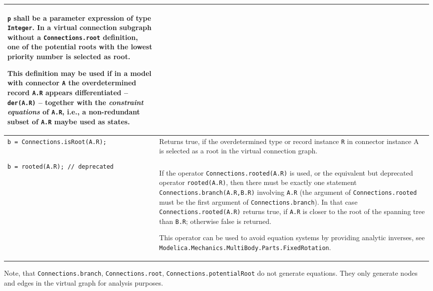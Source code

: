 \begin{longtable}[]{|p{5.1cm}|p{10cm}|}
\lstinline!p! shall be a parameter expression of type \lstinline!Integer!. In a
virtual connection subgraph without a \lstinline!Connections.root! definition, one
of the potential roots with the lowest priority number is selected as
root.
\par
\begin{nonnormative*}
This definition may be used if in a model with connector \lstinline!A! the overdetermined record \lstinline!A.R! appears differentiated -- \lstinline!der(A.R)! -- together
with the \emph{constraint equations} of \lstinline!A.R!, i.e., a non-redundant subset of \lstinline!A.R! maybe used as states.
\end{nonnormative*}
\\ \hline
\lstinline!b = Connections.isRoot(A.R);! & Returns true, if the overdetermined type
or record instance \lstinline!R! in connector instance A is selected as a root in
the virtual connection graph.\\ \hline
\begin{tabular}{@{}p{5.1cm}@{}}
\lstinline!b = Connections.rooted(A.R);!\\
\lstinline!b = rooted(A.R); // deprecated!
\end{tabular}
& If the operator \lstinline!Connections.rooted(A.R)!
is used, or the equivalent but deprecated operator \lstinline!rooted(A.R)!, then
there must be exactly one statement \lstinline!Connections.branch(A.R,B.R)!
involving \lstinline!A.R! (the argument of \lstinline!Connections.rooted! must be the first
argument of \lstinline!Connections.branch!). In that case \lstinline!Connections.rooted(A.R)!
returns true, if \lstinline!A.R! is closer to the root of the spanning tree than
\lstinline!B.R!; otherwise false is returned.
\par
\begin{nonnormative*}
This operator can be used to avoid equation systems by providing analytic inverses, see \lstinline!Modelica.Mechanics.MultiBody.Parts.FixedRotation!.
\end{nonnormative*}
\\ \hline
\end{longtable}

\begin{nonnormative}
Note, that \lstinline!Connections.branch!, \lstinline!Connections.root!,
\lstinline!Connections.potentialRoot! do not generate equations. They only
generate nodes and edges in the virtual graph for analysis purposes.
\end{nonnormative}


